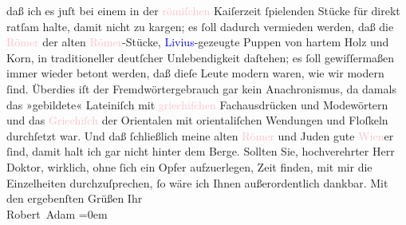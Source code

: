                     daß ich es juſt bei einem in der \textcolor{pink}{römiſchen}{}\ledrightnote{\textcolor{pink}{Rom}}
                    Kaiſerzeit ſpielenden Stücke für direkt ratſam halte, damit nicht zu kargen; es
                    ſoll dadurch vermieden werden, daß die \textcolor{pink}{Römer}{}\ledrightnote{\textcolor{pink}{Rom}}
                    der alten \textcolor{pink}{Römer}{}\ledrightnote{\textcolor{pink}{Rom}}-Stücke, \textcolor{blue}{Livius}{}\ledrightnote{\textcolor{blue}{Titus Livius}}-gezeugte Puppen von hartem Holz und Korn, in
                    traditioneller deutſcher Unlebendigkeit daſtehen; es ſoll gewiſſermaßen immer
                    wieder betont werden, daß dieſe Leute modern waren, wie wir modern ſind.
                    Überdies iſt der Fremdwörtergebrauch gar kein Anachronismus, da damals das
                    »gebildete« Lateiniſch mit \textcolor{pink}{griechiſchen}{}\ledrightnote{\textcolor{pink}{Griechenland}}
                    Fachausdrücken und Modewörtern und das \textcolor{pink}{Griechiſch}{}\ledrightnote{\textcolor{pink}{Griechenland}} der Orientalen mit orientaliſchen Wendungen und Floſkeln
                    durchſetzt war. Und daß ſchließlich meine alten \textcolor{pink}{Römer}{}\ledrightnote{\textcolor{pink}{Rom}} und Juden gute \textcolor{pink}{Wien}{}\ledrightnote{\textcolor{pink}{Wien}}er ſind,
                    damit halt ich gar nicht hinter dem Berge.\pend
           \pstart
           Sollten Sie, hochverehrter Herr Doktor, wirklich, ohne ſich ein Opfer
                    aufzuerlegen, Zeit finden, mit mir die Einzelheiten durchzuſprechen, ſo wäre ich
                    Ihnen außerordentlich dankbar.\pend
           \pstart
           Mit den ergebenſten Grüßen\pend
           \pstart
           Ihr{\\[\baselineskip]}\spacefill\mbox{Robert Adam}\pend
           \leftskip=0em{}\endnumbering{}  
      